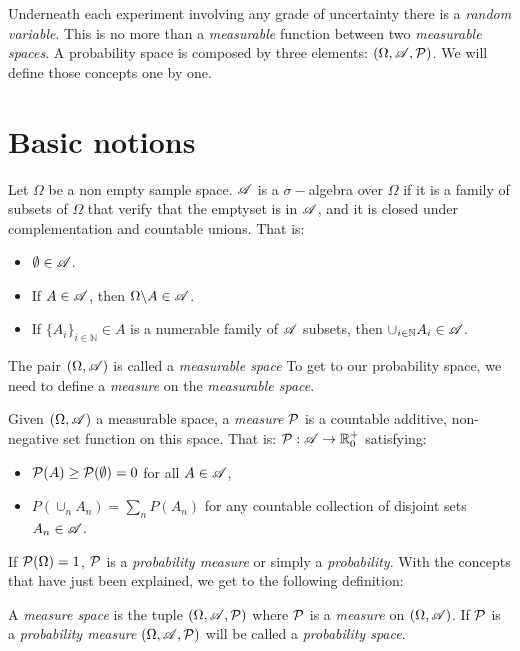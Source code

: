 

Underneath each experiment involving any grade of uncertainty there is a \emph{random variable}. This is no more than a \emph{measurable} function between two \emph{measurable spaces}.
A probability space is composed by three elements: $(\Omega, \mathscr{A}, \mathcal{P})$. We will define those concepts one by one.

\section{Basic notions}

\begin{ndef}Let $\Omega$ be a non empty sample space. $\mathscr{A}$ is a $\sigma-$algebra over $\Omega$ if it is a family of subsets of $\Omega$ that verify that the emptyset is in $\mathscr{A}$, and it is closed under complementation and countable unions. That is:
\begin{itemize}
  \item $\emptyset \in \mathscr{A}$.
  \item If $A \in \mathscr{A}$, then $\Omega \backslash A \in \mathscr{A}$.
  \item If $\{A_i\}_{i \in \mathbb N} \in A$ is a numerable family of $\mathscr{A}$ subsets, then $\cup_{i \in \mathbb N} A_i \in \mathscr{A}$.
\end{itemize}
\end{ndef}


The pair $(\Omega,\mathscr{A})$ is called a \emph{measurable space} To get to our probability space, we need to define a \emph{measure} on the \emph{measurable space}.

\begin{ndef}
Given $(\Omega,\mathscr{A})$ a measurable space, a \emph{measure} $\mathcal{P}$ is a countable additive, non-negative set function on this space. That is: $\mathcal{P}: \mathscr{A} \to \mathbb R_0^+$ satisfying:
\begin{itemize}
  \item $\mathcal{P}(A) \geq \mathcal{P}(\emptyset) = 0$ for all $A \in \mathscr{A}$,
  \item $P(\cup_n A_n) = \sum_n P(A_n)$ for any countable collection of disjoint sets $A_n \in \mathscr{A}$.
\end{itemize}
\end{ndef}

If $\mathcal{P}(\Omega) = 1$, $\mathcal{P}$ is a \emph{probability measure} or simply a \emph{probability}. With the concepts that have just been explained, we get to the following definition:

\begin{ndef}
A \emph{measure space} is the tuple $(\Omega, \mathscr{A},\mathcal{P})$ where $\mathcal{P}$ is a \emph{measure} on $(\Omega, \mathscr{A})$. If $\mathcal{P}$ is a \emph{probability measure} $(\Omega,\mathscr{A},\mathcal{P})$ will be called a \emph{probability space}.
\end{ndef}

